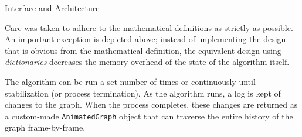 \documentclass{beamer}
\begin{document}
\begin{frame}[fragile,t]
\begin{columns}[t]
\begin{column}{.45\textwidth}
\begin{block}{Interface and Architecture}
\begin{center}
          \end{center}
        Care was taken to adhere to the mathematical definitions
          as strictly as possible.
        An important exception is depicted above;
          instead of implementing the design that
          is obvious from the mathematical definition,
          the equivalent design using \emph{dictionaries}
          decreases the memory overhead of the state
          of the algorithm itself.

        \vspace{.16in}

        The algorithm can be run a set number of times or continuously
        until stabilization (or process termination).  As the
        algorithm runs, a log is kept of changes to the graph.  When
        the process completes, these changes are returned as a
        custom-made \texttt{AnimatedGraph} object that can traverse
        the entire history of the graph frame-by-frame.
      \end{block}
    \end{column}
  \end{columns}
\end{frame}
\end{document}
